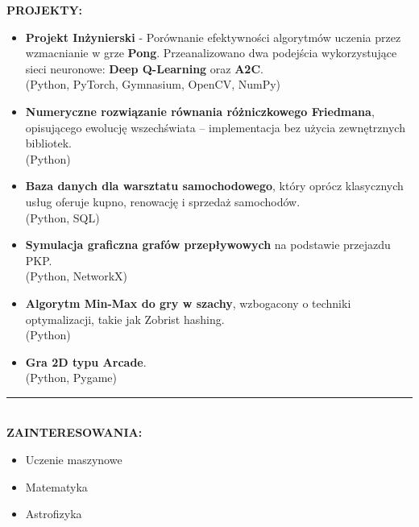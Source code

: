 \documentclass[10pt]{article}
\begin{document}
\fontsize{14pt}{14pt}\selectfont \textbf{\color{Violet}PROJEKTY:}
\fontsize{10pt}{10pt}\selectfont
\begin{itemize}[leftmargin=*]
    \item \textbf{Projekt Inżynierski} - Porównanie efektywności algorytmów uczenia przez wzmacnianie w grze \textbf{Pong}. 
    Przeanalizowano dwa podejścia wykorzystujące sieci neuronowe: \textbf{Deep Q-Learning} oraz \textbf{A2C}. \\
    (Python, PyTorch, Gymnasium, OpenCV, NumPy)
    \item \textbf{Numeryczne rozwiązanie równania różniczkowego Friedmana}, opisującego ewolucję wszechświata – implementacja bez użycia zewnętrznych bibliotek. \\
    (Python)
    \item \textbf{Baza danych dla warsztatu samochodowego}, który oprócz klasycznych usług oferuje kupno, renowację i sprzedaż samochodów. \\
    (Python, SQL)
    \item \textbf{Symulacja graficzna grafów przepływowych} na podstawie przejazdu PKP. \\
    (Python, NetworkX)
    \item \textbf{Algorytm Min-Max do gry w szachy}, wzbogacony o techniki optymalizacji, takie jak Zobrist hashing. \\
    (Python)
    \item \textbf{Gra 2D typu Arcade}. \\
    (Python, Pygame)
\end{itemize}
\rule{17cm}{1pt} \\

\fontsize{14pt}{14pt}\selectfont \textbf{\color{Violet}ZAINTERESOWANIA:}
\fontsize{10pt}{10pt}\selectfont
\begin{itemize}[leftmargin=*]
    \item Uczenie maszynowe
    \item Matematyka
    \item Astrofizyka
\end{itemize}
\end{document}
